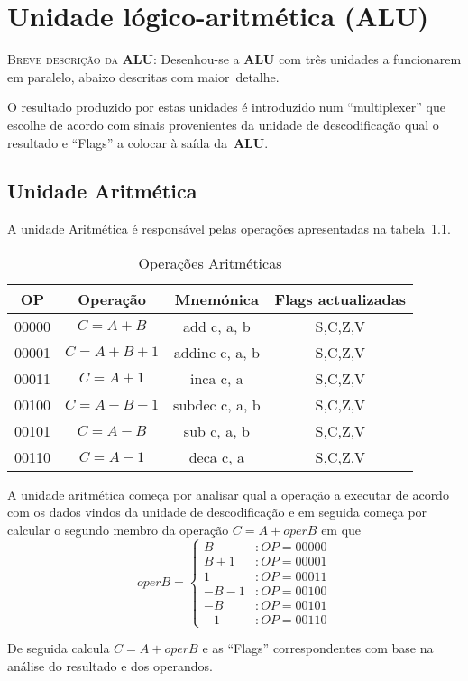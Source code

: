 \chapter{Unidade lógico-aritmética (ALU)}
\textsc{Breve descrição da \textbf{ALU}: } Desenhou-se a \textbf{ALU} com três unidades a funcionarem em paralelo, abaixo descritas com maior~detalhe.\par
O resultado produzido por estas unidades é introduzido num ``multiplexer'' que escolhe de acordo com sinais provenientes da unidade de descodificação qual o resultado e ``Flags'' a colocar à saída da~\textbf{ALU}.

\section{Unidade Aritmética}
A unidade Aritmética é responsável pelas operações apresentadas na tabela~\ref{tabela:arith}.
\begin{table}[h]
	\centering
	\begin{tabular}{|c|c|c|c|}
		\hline
		OP    & Operação & Mnemónica & Flags actualizadas \\ \hline
		00000 & \mbox{$C=A+B$}    & add c, a, b    & S,C,Z,V   \\ \hline
		00001 & \mbox{$C=A+B+1$}  & addinc c, a, b & S,C,Z,V   \\ \hline
		00011 & \mbox{$C=A+1$}    & inca c, a      & S,C,Z,V   \\ \hline
		00100 & \mbox{$C=A-B-1$}  & subdec c, a, b & S,C,Z,V   \\ \hline
		00101 & \mbox{$C=A-B$}    & sub c, a, b    & S,C,Z,V   \\ \hline
		00110 & \mbox{$C=A-1$}    & deca c, a      & S,C,Z,V   \\ \hline
	\end{tabular}
	\caption{Operações Aritméticas}
	\label{tabela:arith}
\end{table}

A unidade aritmética começa por analisar qual a operação a executar de acordo com os dados vindos da unidade de descodificação e em seguida começa por calcular o segundo membro da operação \mbox{$C=A+operB$} em que 
\[ operB=\left\{
	\begin{array}{lr}
	B & : OP=00000\\
	B+1 & : OP=00001\\
	1 & : OP=00011\\
	-B-1 & : OP=00100\\
	-B & : OP=00101\\
	-1 & : OP=00110
	\end{array}
	\right.\]\par
De seguida calcula \mbox{$C=A+operB$} e as ``Flags'' correspondentes com base na análise do resultado e dos operandos.

